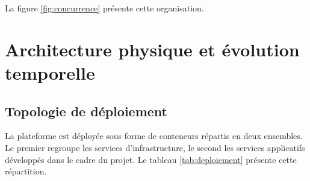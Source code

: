 La figure \ref{fig:concurrence} présente cette organisation.


\section{Architecture physique et évolution temporelle}

\subsection{Topologie de déploiement}

La plateforme est déployée sous forme de conteneurs répartis en deux ensembles. Le premier regroupe les services d'infrastructure, le second les services applicatifs développés dans le cadre du projet. Le tableau \ref{tab:deploiement} présente cette répartition.


